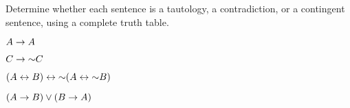 \noindent\problempart Determine whether each sentence is a tautology, a contradiction, or a contingent sentence, using a complete truth table.
\begin{earg}
\item $A \rightarrow A$ %

%

\item $C \rightarrow\mathord{\sim} C$ %



\item $(A \leftrightarrow B) \leftrightarrow \mathord{\sim}(A\leftrightarrow \mathord{\sim} B)$ %
%


\item $(A \rightarrow B) \vee (B \rightarrow A)$ %



\end{earg}
